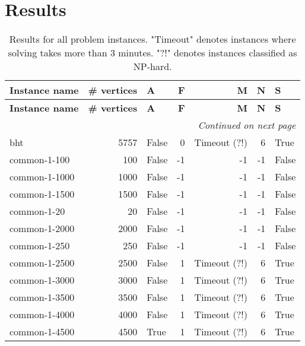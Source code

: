 \section{Results}
 \begin{longtable}{lrlrrrl} \caption{Results for all problem instances. "Timeout" denotes instances where solving takes more than 3 minutes. "?!" denotes instances classified as NP-hard.}\label{table:results}\\ \toprule  \textbf{Instance name}& \textbf{\# vertices}& \textbf{A}& \textbf{F}& \textbf{M}& \textbf{N}& \textbf{S}\\
\midrule
\endfirsthead
\toprule
 \textbf{Instance name}& \textbf{\# vertices}& \textbf{A}& \textbf{F}& \textbf{M}& \textbf{N}& \textbf{S}\\
\midrule
\endhead
\midrule
\multicolumn{7}{r}{\textit{Continued on next page}} \\
\midrule
\endfoot
\bottomrule
\endlastfoot

bht & 5757 & False & 0 & Timeout (?!) & 6 & True \\

common-1-100 & 100 & False & -1 & -1 & -1 & False \\

common-1-1000 & 1000 & False & -1 & -1 & -1 & False \\

common-1-1500 & 1500 & False & -1 & -1 & -1 & False \\

common-1-20 & 20 & False & -1 & -1 & -1 & False \\

common-1-2000 & 2000 & False & -1 & -1 & -1 & False \\

common-1-250 & 250 & False & -1 & -1 & -1 & False \\

common-1-2500 & 2500 & False & 1 & Timeout (?!) & 6 & True \\

common-1-3000 & 3000 & False & 1 & Timeout (?!) & 6 & True \\

common-1-3500 & 3500 & False & 1 & Timeout (?!) & 6 & True \\

common-1-4000 & 4000 & False & 1 & Timeout (?!) & 6 & True \\

common-1-4500 & 4500 & True & 1 & Timeout (?!) & 6 & True \\


\end{longtable}
